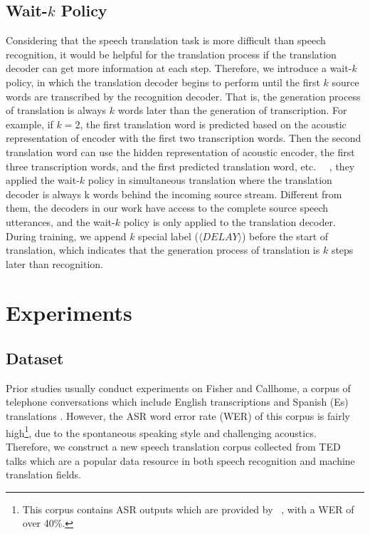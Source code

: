 \documentclass[letterpaper]{article} %
\begin{document}
\subsection{Wait-$k$ Policy}
Considering that the speech translation task is more difficult than speech recognition, it would be helpful for the translation process if the translation decoder can get more information at each step.
Therefore, we introduce a wait-$k$ policy, in which the translation decoder begins to perform until the first $k$ source words are transcribed by the recognition decoder. That is, the generation process of translation is always $k$ words later than the generation of transcription. For example, if $k=2$, the first translation word is predicted based on the acoustic representation of encoder with the first two transcription words. Then the second translation word can use the hidden representation of acoustic encoder, the first three transcription words, and the first predicted translation word, etc.
~\citeauthor{ma2018stacl}~, they applied the wait-$k$ policy in simultaneous translation where the translation decoder is always k words behind the incoming source stream. Different from them, the decoders in our work have access to the complete source speech utterances, and the wait-$k$ policy is only applied to the translation decoder. During training, we append $k$ special label ($\langle DELAY\rangle$) before the start of translation, which indicates that the generation process of translation is $k$ steps later than recognition.

\section{Experiments}
\subsection{Dataset}
Prior studies usually conduct experiments on Fisher and Callhome, a corpus of telephone conversations which include English transcriptions and Spanish (Es) translations \cite{post2013improved}. However, the ASR word error rate (WER) of this corpus is fairly high\footnote{This corpus contains ASR outputs which are provided by \citeauthor{post2013improved}~, with a WER of over 40\%.}, due to the spontaneous speaking style and challenging acoustics. %
Therefore, we construct a new speech translation corpus collected from TED talks which are a popular data resource in both speech recognition and machine translation fields.
\end{document}
